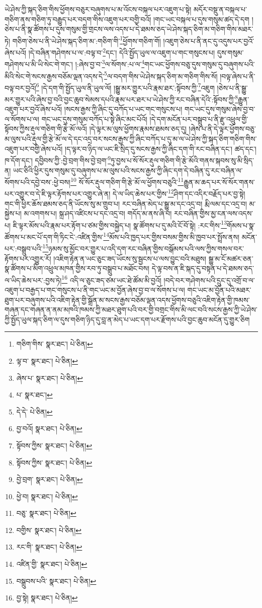 ཡེ་ཤེས་ཀྱི་སྐད་ཅིག་གིས་ཕྱོགས་བཅུར་བཞུགས་པ་མ་འོངས་བསྐལ་པར་འཇུག་པ་སྟེ། མདོར་བསྡུ་ན་བསྐལ་པ་གཅིག་ནས་གཅིག་ཏུ་བརྒྱུད་པར་བདག་གིས་འཇུག་པར་བགྱི་བའོ། །གང་ཡང་བསྐལ་པ་དུས་གསུམ་ཚད་དེ་དག །ཅེས་པ་ནི་སྣ་ཚོགས་པ་དུས་གསུམ་གྱི་གྲངས་ལས་འདས་པ་དེ་ཐམས་ཅད་ཡེ་ཤེས་སྐད་ཅིག་མ་གཅིག་གིས་མཐར་ཏེ། གཅིག་ཅེས་པ་ནི་ཡེ་ཤེས་སྐད་ཅིག་མ་:གཅིག་གི་\footnote{གཅིག་གིས་  སྣར་ཐང་།  པེ་ཅིན། }ཕྱོགས་གཅིག་གོ། །འཇུག་ཅེས་པ་ནི་ནང་དུ་འདུས་པར་བྱའོ་ཞེས་པའོ། །དེ་བཞིན་གཤེགས་པ་ལ་:བལྟ་བ་\footnote{ལྟ་བ་  སྣར་ཐང་།  པེ་ཅིན། }དང་། དེའི་སྤྱོད་ཡུལ་ལ་འཇུག་པ་གང་གསུངས་པ། དུས་གསུམ་གཤེགས་པ་མི་ཡི་སེང་གེ་གང་། །:ཞེས་བྱ་བ་\footnote{ཞེས་པ་  སྣར་ཐང་།  པེ་ཅིན། }ལ་སོགས་:པ་ལ་\footnote{པ་  སྣར་ཐང་། }གང་ཡང་ཕྱོགས་བཅུ་དུས་གསུམ་དུ་བཞུགས་པའི་མིའི་སེང་གེ་སངས་རྒྱས་བཅོམ་ལྡན་འདས་དེ་\footnote{དེ་དེ་  པེ་ཅིན། }ལ་བདག་གིས་ཡེ་ཤེས་སྐད་ཅིག་མ་གཅིག་གིས་སོ། །བལྟ་ཞེས་པ་ནི་བལྟ་བར་བྱའོ།\footnote{བྱ་བའོ།  སྣར་ཐང་།  པེ་ཅིན། } །དེ་དག་གི་སྤྱོད་ཡུལ་ནི་ཡུལ་ལོ། །སྒྱུ་མར་གྱུར་པའི་རྣམ་ཐར་:སྟོབས་ཀྱི་\footnote{སྟོབས་ཀྱིས་  སྣར་ཐང་།  པེ་ཅིན། }འཇུག །ཅེས་པ་ནི་སྒྱུ་མར་གྱུར་པའི་ཞེས་བྱ་བའི་བྱང་ཆུབ་སེམས་དཔའི་རྣམ་པར་ཐར་པ་ཡེ་ཤེས་ཀྱི་རང་བཞིན་དེའི་:སྟོབས་ཀྱི་\footnote{སྟོབས་ཀྱིས་  སྣར་ཐང་།  པེ་ཅིན། }རྒྱུན་འཇུག་པར་བྱའོ་ཞེས་པའོ། །སངས་རྒྱས་ཀྱི་ཞིང་དུ་བཀོད་པ་ཡང་གང་གསུངས་པ། གང་ཡང་དུས་གསུམ་ཞེས་བྱ་བ་ལ་སོགས་པ་ལ། གང་ཡང་དུས་གསུམ་བཀོད་པ་སྟེ་ཞིང་མང་པོའོ། །དེ་དག་མངོན་པར་བསྒྲུབ་པ་ནི་རྫུ་འཕྲུལ་གྱི་སྟོབས་ཀྱིས་རྡུལ་གཅིག་གི་རྩེ་མོ་ལའོ། །དེ་ལྟར་མ་ལུས་ཕྱོགས་རྣམས་ཐམས་ཅད་དུ། །ཞེས་པ་ནི་དེ་ལྟར་ཕྱོགས་བཅུ་མ་ལུས་པའི་རྡུལ་གྱི་རྩེ་མོ་ལ་དེ་དང་འདྲ་བར་སངས་རྒྱས་ཀྱི་ཞིང་བཀོད་པ་དུ་མ་ལ་ཡེ་ཤེས་ཀྱི་སྐད་ཅིག་གཅིག་གིས་འཇུག་པར་བགྱི་ཞེས་པའོ། །ད་ལྟར་བ་ཉིད་ལ་ཡང་ཇི་སྲིད་དུ་སངས་རྒྱས་ཀྱི་ཞིང་དག་གི་རང་བཞིན་དང་། ཚད་དང་། ཁ་དོག་དང་། དབྱིབས་ཀྱི་:བྱེ་བྲག་གིས་བྱེ་བྲག་\footnote{བྱེ་བྲག་  སྣར་ཐང་།  པེ་ཅིན། }ཏུ་བྱས་པ་སོ་སོར་རྡུལ་གཅིག་གི་རྩེ་མོའི་གནས་སྐབས་སུ་མི་སྲིད་ན། ཡང་ཅིའི་ཕྱིར་དུས་གསུམ་དུ་བཞུགས་པ་མ་ལུས་པའི་སངས་རྒྱས་ཀྱི་ཞིང་དག་དེ་བཞིན་དུ་རང་བཞིན་ལ་སོགས་པའི་དབྱེ་བས་:ཕྱེ་བས།\footnote{ཕྱེ་བ།  སྣར་ཐང་།  པེ་ཅིན། } སོ་སོར་རྡུལ་གཅིག་གི་རྩེ་མོ་ལ་ཕྱོགས་བཅུའི་\footnote{བཅུ་  སྣར་ཐང་།  པེ་ཅིན། }རྒྱུན་མ་ཆད་པར་སོ་སོར་གནས་པར་འགྱུར་བ་དེ་ཇི་ལྟར་རྟོགས་པར་འགྱུར་ཞེ་ན། དེ་ལ་ཡིད་ཆེས་པར་གྱིས་\footnote{བགྱིས་  སྣར་ཐང་།  པེ་ཅིན། }ཤིག་དང་འདིར་བརྗོད་པར་བྱ་སྟེ། གང་གི་ཕྱིར་ཆོས་ཐམས་ཅད་ནི་ཡོངས་སུ་མ་གྲུབ་པ། རང་བཞིན་མེད་པ་སྒྱུ་མ་དང་འདྲ་བ། རྨི་ལམ་དང་འདྲ་བ། མ་སྐྱེས་པ། མ་འགགས་པ། སྐྲ་ཤད་འཛིངས་པ་དང་འདྲ་བ། གདོད་མ་ནས་ཞི་བ། རང་བཞིན་གྱིས་མྱ་ངན་ལས་འདས་པ། ཇི་ལྟར་མོས་པའི་རྣམ་པར་རྟོག་པ་ཙམ་གྱིས་བསྐྱེད་པ། སྣ་ཚོགས་པ་དུ་མའི་ངོ་བོ་སྟེ། :རང་གིས་\footnote{རང་གི་  སྣར་ཐང་།  པེ་ཅིན། }གོམས་པ་སྣ་ཚོགས་པ་མང་པོ་དག་གི་ཏིང་ངེ་:འཛིན་གྱིས་\footnote{འཛིན་གྱི་  སྣར་ཐང་།  པེ་ཅིན། }མོས་པའི་ཁྱད་པར་གྱིས་བསམ་གྱིས་མི་ཁྱབ་པར་སྤྲོས་ནས། མངོན་པར་:བསྒྲུབ་པའི་\footnote{བསྒྲུབས་པའི་  སྣར་ཐང་།  པེ་ཅིན། }ཉམས་སུ་མྱོང་བར་གྱུར་པ་འདི་དག་རང་བཞིན་གྱིས་བསྒོམས་པའི་ལས་ཀྱིས་གསལ་བར་རྟོགས་པར་འགྱུར་རོ། །འཇིག་རྟེན་ན་ཡང་ཅུང་ཟད་ཡོངས་སུ་སྦྱངས་པ་ལས་བྱུང་བའི་མཐུས། སྒྱུ་མ་ངོ་མཚར་ཅན་སྣ་ཚོགས་པ་མིག་འཕྲུལ་མཁན་གྱིས་རབ་ཏུ་བསྒྲུབ་པ་མཐོང་བས། དེ་ལྟ་བས་ན་ཇི་སྐད་དུ་བསྟན་པ་དེ་ཐམས་ཅད་ལ་ཡིད་ཆེས་པར་:བྱས་ཏེ།\footnote{བྱ་སྟེ།  སྣར་ཐང་།  པེ་ཅིན། } འདི་ལ་ཅུང་ཟད་ཙམ་ཡང་ཐེ་ཚོམ་མི་བྱའོ། །བདེ་བར་གཤེགས་པའི་དྲུང་དུ་འགྲོ་བ་ལ་འཇུག་པ་བརྒྱད་པ་གང་གསུངས་པ་ནི་གང་ཡང་མ་བྱོན་ཞེས་བྱ་བ་ལ་སོགས་པ་ལ། གང་ཡང་མ་བྱོན་པའི་མཐར་ཐུག་པར་བཞུགས་པའི་འཇིག་རྟེན་གྱི་སྒྲོན་མ་སངས་རྒྱས་བཅོམ་ལྡན་འདས་ཕྱོགས་བཅུའི་འཇིག་རྟེན་གྱི་ཁམས་གཞན་དང་གཞན་ན་ནམ་མཁའི་ཁམས་ཀྱི་མཐར་ཐུག་པའི་བར་གྱི་བགྲང་གིས་མི་ལང་བའི་སངས་རྒྱས་ཀྱི་ཡེ་ཤེས་ཀྱི་སྤྱོད་ཡུལ་སྐད་ཅིག་ལ་དུས་གཅིག་ཉིད་དུ་བླ་ན་མེད་པ་ཡང་དག་པར་རྫོགས་པའི་བྱང་ཆུབ་མངོན་དུ་གྱུར་ཅིག 